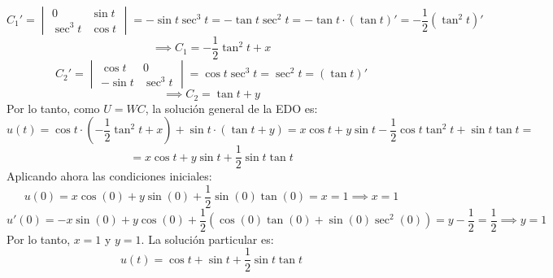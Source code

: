 {    \[
        C_1' =
        \begin{vmatrix}
            0 & \sin t \\
            \sec^3 t & \cos t
        \end{vmatrix}
        = -\sin t \sec^3 t =
        - \tan t \sec^2 t =
        - \tan t \cdot (\tan t)' =
        - \frac{1}{2} (\tan^2 t)'
    \]
    \[
        \implies \boxed{C_1 = -\frac{1}{2} \tan^2 t + x}
    \]
    \[
        C_2' =
        \begin{vmatrix}
            \cos t & 0 \\
            -\sin t & \sec^3 t
        \end{vmatrix}
        = \cos t \sec^3 t =
        \sec^2 t =
        (\tan t)'
    \]
    \[
        \implies \boxed{C_2 = \tan t + y}
    \]
    Por lo tanto, como $U = W C$, la solución general de la EDO es:
    \[
        u(t) = \cos t \cdot \left(-\frac{1}{2} \tan^2 t + x\right) + \sin t \cdot (\tan t + y) =
        x \cos t + y \sin t - \frac{1}{2} \cos t \tan^2 t + \sin t \tan t =
    \]
    \[
        = x \cos t + y \sin t + \frac{1}{2} \sin t \tan t
    \]
    Aplicando ahora las condiciones iniciales:
    \[
        u(0) = x \cos(0) + y \sin(0) + \frac{1}{2} \sin(0) \tan(0) = x = 1 \implies 
        x = 1
    \]
    \[
        u'(0) = -x \sin(0) + y \cos(0) + \frac{1}{2} (\cos(0) \tan(0) + \sin(0) \sec^2(0)) = y - \frac{1}{2} = \frac{1}{2} \implies
        y = 1
    \]
    Por lo tanto, $x = 1$ y $y = 1$. La solución particular es:
    \[
        u(t) = \cos t + \sin t + \frac{1}{2} \sin t \tan t
    \]
}


